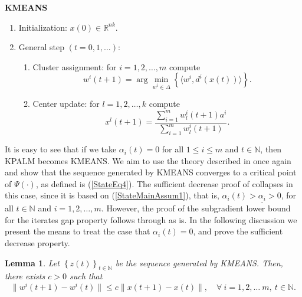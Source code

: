 \documentclass[12pt]{article}
\numberwithin{equation}{section}
\newtheorem{lemma}{Lemma}[proposition]
\begin{document}
\begin{framed}
\noindent \textbf{KMEANS}
\begin{enumerate}[(1)]
	\item Initialization: $x(0) \in \mathbb{R}^{nk}$.
	\item General step $\left( t=0,1, \ldots \right)$:
	\begin{enumerate}[(2.1)]
		\item Cluster assignment: for $i=1, 2, \ldots ,m$ compute
		\begin{equation}
			w^i(t+1) = \arg\!\min\limits_{w^i \in \Delta} \left\lbrace \langle w^i , d^i(x(t)) \rangle\right\rbrace . \label{StateEq12}
		\end{equation}
		\item Center update: for $l=1, 2, \ldots ,k$ compute
		\begin{equation}
			x^l(t+1) = \frac{\sum_{i=1}^{m} w^i_l(t+1) a^i}{\sum_{i=1}^{m} w^i_l(t+1)} . \label{StateEq13}
		\end{equation}
	\end{enumerate}
\end{enumerate}
\end{framed}

It is easy to see that if we take $\alpha_i(t) = 0$ for all $1 \leq i \leq m$ and $t \in \mathbb{N}$, then KPALM becomes KMEANS. We aim to use the theory described in  once again and show that the sequence generated by KMEANS converges to a critical point of $\Psi(\cdot)$, as defined is (\ref{StateEq4}). The sufficient decrease proof of  collapses in this case, since it is based on (\ref{StateMainAssum1}), that is, $\alpha_i(t) > \underline{\alpha_i} > 0$, for all $t \in \mathbb{N}$ and $i=1,2, \ldots, m$. However, the proof of the subgradient lower bound for the iterates gap property follows through as is. In the following discussion we present the means to treat the case that $\alpha_i(t) = 0$, and prove the sufficient decrease property.

\begin{lemma} \label{StateLemma_x_bounds_w}
Let $\left\lbrace z(t) \right\rbrace_{t \in \mathbb{N}}$ be the sequence generated by KMEANS. Then, there exists $c > 0$ such that
\begin{equation*}
	\|w^i(t+1)-w^i(t)\| \leq c \|x(t+1)-x(t)\| , \quad \forall \: i=1,2, \ldots\ m, \: t \in \mathbb{N} .
\end{equation*}
\end{lemma}
\end{document}
